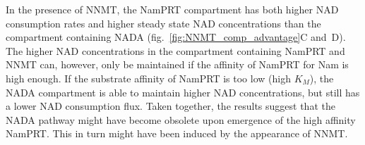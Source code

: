 In the presence of NNMT, the NamPRT compartment has both higher NAD consumption rates and higher steady state NAD concentrations than the compartment containing NADA (fig.~\ref{fig:NNMT_comp_advantage}C and~D). The higher NAD concentrations in the compartment containing NamPRT and NNMT can, however, only be maintained if the affinity of NamPRT for Nam is high enough. If the substrate affinity of NamPRT is too low (high $K_{M}$), the NADA compartment is able to maintain higher NAD concentrations, but still has a lower NAD consumption flux. Taken together, the results suggest that the NADA pathway might have become obsolete upon emergence of the high affinity NamPRT. This in turn might have been induced by the appearance of NNMT.
